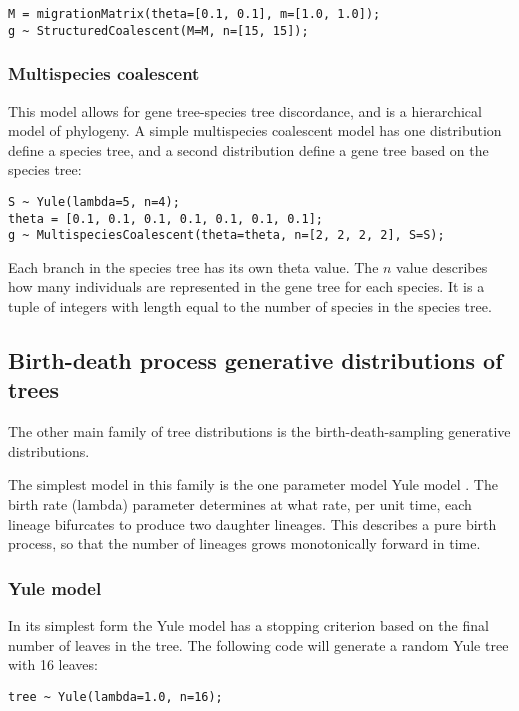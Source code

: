 \documentclass[oneside]{article}
\begin{document}
\begin{verbatim}
M = migrationMatrix(theta=[0.1, 0.1], m=[1.0, 1.0]);
g ~ StructuredCoalescent(M=M, n=[15, 15]);
\end{verbatim}

\subsubsection{Multispecies coalescent}

This model allows for gene tree-species tree discordance, and is a
hierarchical model of phylogeny.
A simple multispecies coalescent model has one distribution define a
species tree, and a second distribution define a gene tree based on
the species tree:

\begin{verbatim}
S ~ Yule(lambda=5, n=4);
theta = [0.1, 0.1, 0.1, 0.1, 0.1, 0.1, 0.1];
g ~ MultispeciesCoalescent(theta=theta, n=[2, 2, 2, 2], S=S);
\end{verbatim}

Each branch in the species tree has its own theta value.
The $n$ value describes how many individuals are represented in
the gene tree for each species.
It is a tuple of integers with length equal to the number of species
in the species tree.

\subsection{Birth-death process generative distributions of trees}

The other main family of tree distributions is the birth-death-sampling generative distributions.

The simplest model in this family is the one parameter model Yule model \cite{yule1925ii}. 
The birth rate (lambda) parameter determines at what rate, per unit time, each lineage bifurcates to produce two daughter lineages. 
This describes a pure birth process, so that the number of lineages grows monotonically forward in time. 

\subsubsection{Yule model}

In its simplest form the Yule model has a stopping criterion based on the final number of leaves in the tree. 
The following code will generate a random Yule tree with 16 leaves:

\begin{verbatim}
tree ~ Yule(lambda=1.0, n=16);
\end{verbatim}
\end{document}
